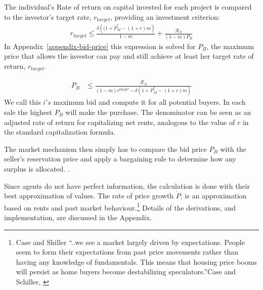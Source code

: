 The individual's Rate of return on capital  invested  for each project  is compared to the investor's target rate, $r_{target}$, providing  an investment criterion:
\begin{eqnarray}
r_{target} \le \frac{\delta \left((1+ \dot P_M^e - (1+r)m\right)}{1-m} + \frac{\mathcal{R}_N}{(1-m)P_B}
\end{eqnarray}
In Appendix~\ref{appendix-bid-price} this expression is solved for $P_B$, the  maximum price that allows the investor can pay and still achieve at least her  target rate of return, $r_{target}$.  

\begin{eqnarray}
P_B & \le    \frac{\mathcal{R}_N}{(1-m)r^{target}-\delta \left(1 + \dot P_M^e - (1+r)m\right)} \label{equation-Bidprice}\end{eqnarray}
We call this  $i's$ maximum bid and compute it for all potential buyers. In each sale the highest $P_B$ will make the purchase. The denominator can be seen as an adjusted rate of return for capitalizing net rents, analogous to the value of $r$ in  the standard capitalization formula.

The market mechanism then simply has to compare the bid price  $P_B$ with the seller's reservation price and apply a bargaining rule to determine how any surplus is allocated. .%

Since  agents do not have perfect information, the calculation is done with their best approximation of values. %
 The rate of price growth $\dot P$, is an approximation based on rents and past market behaviour.\footnote{Case and Shiller ``..we see a market largely driven by expectations. People seem to form their expectations from past price movements rather than having any knowledge of fundamentals. This means that housing price booms will persist as home buyers become destabilizing speculators.''Case and Schiller, \cite{caseThereBubbleHousing2003}} Details of the derivations, and implementation, are discussed in the Appendix. %



